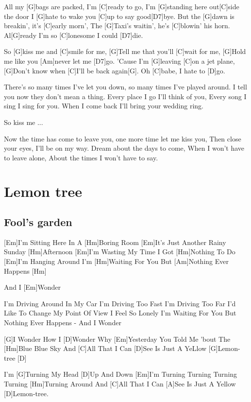 \documentclass[a4paper,12pt]{article}
\begin{document}
\begin{multicols}{2}
\begin{guitar}
All my [G]bags are packed, I'm [C]ready to go,
I'm [G]standing here out[C]side the door
I [G]hate to wake you [C]up to say good[D7]bye.
But the [G]dawn is breakin', it's [C]early morn',
The [G]Taxi's waitin', he's [C]blowin' his horn.
Al[G]ready I'm so [C]lonesome I could [D7]die.


So [G]kiss me and [C]smile for me,
[G]Tell me that you'll [C]wait for me,
[G]Hold me like you [Am]never let me [D7]go.
'Cause I'm [G]leaving [C]on a jet plane,
[G]Don't know when [C]I'll be back again[G].
Oh [C]babe, I hate to [D]go.


There's so many times I've let you down, 
so many times I've played around.
I tell you now they don't mean a thing.
Every place I go I'll think of you, 
Every song I sing I sing for you.
When I come back I'll bring 
your wedding ring.


So kiss me ...


Now the time has come to leave you, 
one more time let me kiss you,
Then close your eyes, I'll be on my way.
Dream about the days to come,  
When I won't have to leave alone,
About the times I won't have to say.

\end{guitar}
\section{Lemon tree}
\subsection*{Fool's garden}
\begin{guitar}
[Em Hm Em Hm Am Hm Em]

[Em]I'm Sitting Here In A [Hm]Boring Room
[Em]It's Just Another Rainy Sunday [Hm]Afternoon
[Em]I'm Wasting My Time I Got [Hm]Nothing To Do
[Em]I'm Hanging Around I'm [Hm]Waiting For You
But [Am]Nothing Ever Happens [Hm]

And I [Em]Wonder


I'm Driving Around In My Car
I'm Driving Too Fast I'm Driving Too Far
I'd Like To Change My Point Of View
I Feel So Lonely I'm Waiting For You
But Nothing Ever Happens - And I Wonder


[G]I Wonder How I [D]Wonder Why
[Em]Yesterday You Told Me 'bout The [Hm]Blue Blue Sky
And [C]All That I Can [D]See 
Is Just A YeLlow [G]Lemon-tree [D]


I'm [G]Turning My Head [D]Up And Down
[Em]I'm Turning Turning Turning Turning
[Hm]Turning Around
And [C]All That I Can [A]See
Is Just A Yellow [D]Lemon-tree.



\end{guitar}
\end{multicols}
\end{document}
